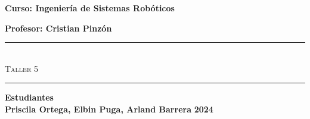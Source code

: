 \begin{titlepage}
\begin{center}
      {\Large \textbf{Curso: Ingeniería de Sistemas Robóticos}}\medskip
      
      {\Large \textbf{Profesor: Cristian Pinzón}}

      \rule{\linewidth}{0.75mm}\\
          {\Large \textsc{Taller 5}} 
      \rule{\linewidth}{0.75mm}\medskip

      {\Large \textbf{Estudiantes}}\\
      \vspace{5mm}
      {\Large \textbf{Priscila Ortega, Elbin Puga, Arland Barrera}}
      \vfill
      {\Huge \textbf{2024}}

  \end{center}
\end{titlepage}